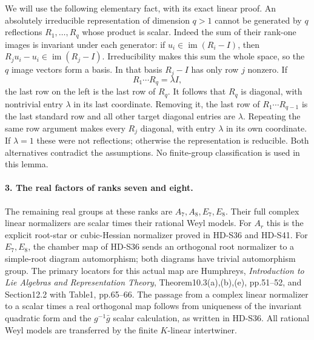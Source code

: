 We will use the following elementary fact, with its exact
linear proof. An absolutely irreducible representation of
dimension \(q>1\) cannot be generated by \(q\) reflections
\(R_1,\ldots,R_q\) whose product is scalar. Indeed the
sum of their rank-one images is invariant under each
generator: if \(u_i\in\operatorname{im}(R_i-I)\), then
\(R_j u_i-u_i\in\operatorname{im}(R_j-I)\).
Irreducibility makes this sum the whole space, so the
\(q\) image vectors form a basis. In that basis \(R_j-I\)
has only row \(j\) nonzero. If
\[
                       R_1\cdots R_q=\lambda I,             \tag{S45.6}
\]
the last row on the left is the last row of \(R_q\).
It follows that \(R_q\) is diagonal, with nontrivial
entry \(\lambda\) in its last coordinate. Removing it,
the last row of \(R_1\cdots R_{q-1}\) is the last
standard row and all other target diagonal entries are
\(\lambda\). Repeating the same row argument makes every
\(R_j\) diagonal, with entry \(\lambda\) in its own
coordinate. If \(\lambda=1\) these were not reflections;
otherwise the representation is reducible. Both alternatives
contradict the assumptions. No finite-group classification
is used in this lemma.

\paragraph{3. The real factors of ranks seven and eight.}
The remaining real groups at these ranks are
\(A_7,A_8,E_7,E_8\). Their full complex linear
normalizers are scalar times their rational Weyl models.
For \(A_r\) this is the explicit root-star or cubic-Hessian
normalizer proved in HD-S36 and HD-S41. For \(E_7,E_8\),
the chamber map of HD-S36 sends an orthogonal root normalizer
to a simple-root diagram automorphism; both diagrams have
trivial automorphism group. The primary locators for this
actual map are Humphreys, \emph{Introduction to Lie Algebras
and Representation Theory}, Theorem10.3(a),(b),(e),
pp.51--52, and Section12.2 with Table1, pp.65--66.
The passage from a complex linear normalizer to a scalar
times a real orthogonal map follows from uniqueness of the
invariant quadratic form and the \(g^{-1}\bar g\) scalar
calculation, as written in HD-S36. All rational Weyl models
are transferred by the finite \(K\)-linear intertwiner.

